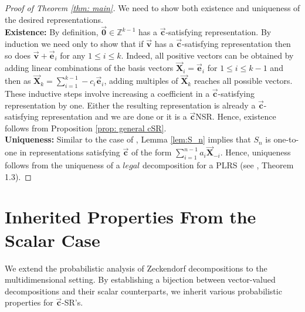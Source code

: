 \documentclass[]{interact}
\newcommand{\vtr}[1]{\vec{\mathbf{#1}}}
\theoremstyle{plain}
\numberwithin{equation}{section} %
\numberwithin{table}{section} %
\numberwithin{figure}{section}
\begin{document}
\begin{proof}[Proof of Theorem \textcolor{blue}{\ref{thm: main}}]

We need to show both existence and uniqueness of the desired representations.\\
  
\textbf{Existence:} By definition, $\vtr{0}\in \mathbb{Z}^{k-1}$ has a $\vtr{c}$-satisfying representation.  By induction we need only to show that if $\vtr{v}$ has a  $\vtr{c}$-satisfying representation then so does $\vtr{v}+\vtr{e}_i$ for any $1\leq i\leq k$. Indeed, all positive vectors can be obtained by adding linear combinations of the basis vectors $\vtr{X}_i=\vtr{e}_i$ for $1\leq i\leq k-1$ and then as $\vtr{X}_k=\sum_{i=1}^{k-1}-c_i\vtr{e}_i$, adding multiples of $\vtr{X}_k$ reaches all possible vectors. These inductive steps involve increasing a coeﬃcient in a
$\vtr{c}$-satisfying representation by one. Either the resulting representation is already a $\vtr{c}$-satisfying representation and we are done or it is a $\vtr{c}$NSR. Hence, existence follows from Proposition \textcolor{blue}{\ref{prop: general cSR}}.\\

\textbf{Uniqueness:} Similar to the case of \textcolor{blue}{\cite{ABJ11}}, Lemma \textcolor{blue}{\ref{lem:S_n}} implies that $S_n$ is one-to-one in representations satisfying $\vtr{c}$ of the form $\sum_{i=1}^{n-1}a_i \vtr{X}_{-i}$. Hence, uniqueness follows from the uniqueness of a $\textit{legal}$ decomposition for a PLRS (see \textcolor{blue}{\cite{KKMW11}}, Theorem 1.3).

\end{proof}






\section{Inherited Properties From the Scalar Case}

We extend the probabilistic analysis of Zeckendorf decompositions to the multidimensional setting. By establishing a bijection between vector-valued decompositions and their scalar counterparts, we inherit various probabilistic properties for $\vtr{c}$-SR's.


\end{document}
